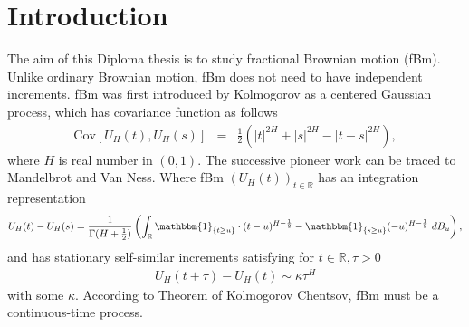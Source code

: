\documentclass[a4paper, twoside, 11pt]{article}
\theoremstyle{definition}
\newcommand{\brkt}[1]{\left({#1} \right)}
\begin{document}
\section{Introduction}
The aim of this Diploma thesis is to study fractional Brownian motion (fBm). Unlike ordinary Brownian motion, fBm does not need to have independent increments. fBm was first introduced by Kolmogorov\cite{kolm} as a centered Gaussian process, which has covariance function as follows
\begin{eqnarray*}
  \mathrm{Cov}[U_H(t), U_H(s)] &=& \frac{1}{2} (|t|^{2H} + |s|^{2H} - |t-s|^{2H}),
\end{eqnarray*}
where $H$ is real number in $(0, 1)$. The successive pioneer work can be traced to Mandelbrot and Van Ness\cite{mandelbrot}. Where fBm $(U_H(t))_{t\in \mathbb{R}}$ has an integration representation
\begin{eqnarray*}
 	U_H(t) - U_H(s) = \frac{1}{\Gamma(H+\frac{1}{2})}\brkt{\int_{\mathbb{R}} \mathbbm{1}_{\{t\ge u\}}\cdot (t-u)^{H-\frac{1}{2}} - \mathbbm{1}_{\{s\ge u\}} (-u)^{H-\frac{1}{2}} \, \mathop{dB_u}},
	\label{sec:int}
\end{eqnarray*}
and has stationary self-similar increments satisfying for $t\in \mathbb{R}, \tau > 0$
\begin{eqnarray*}
  U_H(t+\tau) - U_H(t) \sim \kappa \tau^{H} 
  \label{sec:int1}
\end{eqnarray*}
with some $\kappa$. According to Theorem of Kolmogorov Chentsov, fBm must be a continuous-time process.\\
\end{document}

